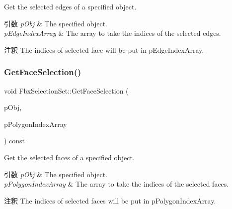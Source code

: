 Get the selected edges of a specified object. 
\begin{DoxyParams}{引数}
{\em p\+Obj} & The specified object. \\
\hline
{\em p\+Edge\+Index\+Array} & The array to take the indices of the selected edges. \\
\hline
\end{DoxyParams}
\begin{DoxyRemark}{注釈}
The indices of selected face will be put in p\+Edge\+Index\+Array. 
\end{DoxyRemark}
\mbox{\label{class_fbx_selection_set_ae304339bd66b4edca36c3f74517cb762}} 
\subsubsection{\texorpdfstring{Get\+Face\+Selection()}{GetFaceSelection()}}
{\footnotesize\ttfamily void Fbx\+Selection\+Set\+::\+Get\+Face\+Selection (\begin{DoxyParamCaption}\item[{\hyperlink{class_fbx_object}{Fbx\+Object} $\ast$}]{p\+Obj,  }\item[{\hyperlink{class_fbx_array}{Fbx\+Array}$<$ int $>$ \&}]{p\+Polygon\+Index\+Array }\end{DoxyParamCaption}) const}

Get the selected faces of a specified object. 
\begin{DoxyParams}{引数}
{\em p\+Obj} & The specified object. \\
\hline
{\em p\+Polygon\+Index\+Array} & The array to take the indices of the selected faces. \\
\hline
\end{DoxyParams}
\begin{DoxyRemark}{注釈}
The indices of selected faces will be put in p\+Polygon\+Index\+Array. 
\end{DoxyRemark}
\mbox{\label{class_fbx_selection_set_af0b2e85e61badfce8f700df48a8c0e50}} 

